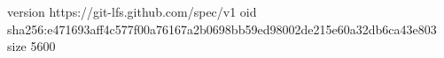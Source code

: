 version https://git-lfs.github.com/spec/v1
oid sha256:e471693aff4c577f00a76167a2b0698bb59ed98002de215e60a32db6ca43e803
size 5600
